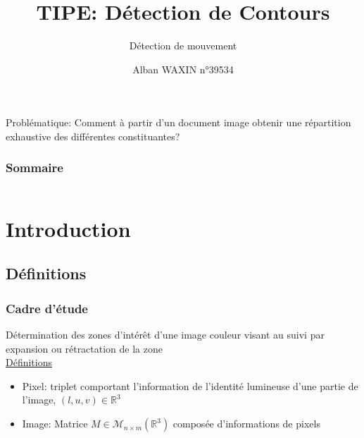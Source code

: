 \documentclass{beamer}
\title{TIPE: Détection de Contours}
\subtitle{Détection de mouvement}
\author{Alban WAXIN n°39534}
\date
\newcommand{\R}{\mathbb{R}}
\begin{document}
\frame{\titlepage}

\begin{frame}
\begin{block}
{Problématique:} Comment à partir d'un document image obtenir une répartition exhaustive des différentes constituantes?
\end{block}
\end{frame}

\begin{frame}
\frametitle{Sommaire}
\begin{columns}[t]
  \begin{column}{7.5cm}
  \tableofcontents[sections={1,2}]
  \end{column}
  \begin{column}{4.5cm}
  \tableofcontents[sections={3}]
  \end{column}
  \end{columns}
\setcounter{tocdepth}{2}
\end{frame}

\section{Introduction}
\subsection{Définitions}

\begin{frame}[fragile]
\frametitle{Cadre d'étude}
Détermination des zones d'intérêt d'une image couleur visant au suivi  par expansion ou rétractation de la zone\\

\underline{Définitions}

\begin{itemize}
\item Pixel: triplet comportant l'information de l'identité lumineuse d'une partie de l'image, $(l,u,v) \in \R^3 $
\item Image: Matrice $M \in \mathcal{M}_{n\times m}(\R^3)$ composée d'informations de pixels
\end{itemize}  
\end{frame}
\end{document}
